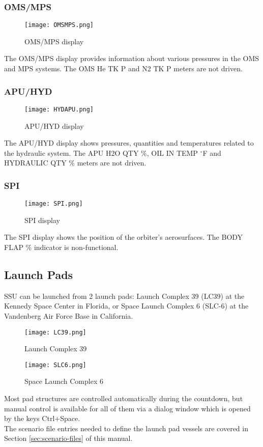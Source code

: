 \documentclass[Space_Shuttle_Ultra_Manual.tex]{subfiles}
\begin{document}
\begin{multicols*}{2}
\subsubsection{OMS/MPS}
\begin{figure}[H]
  \texttt{[image: OMSMPS.png]}
  \caption{OMS/MPS display}
  \label{fig:OMS_MPS_MEDS}
\end{figure}
The OMS/MPS display provides information about various pressures in the OMS and MPS systems. The OMS He TK P and N2 TK P meters are not driven.

\subsubsection{APU/HYD}
\begin{figure}[H]
  \texttt{[image: HYDAPU.png]}
  \caption{APU/HYD display}
  \label{fig:APU_HYD_MEDS}
\end{figure}
The APU/HYD display shows pressures, quantities and temperatures related to the hydraulic system. The APU H2O QTY \%, OIL IN TEMP $^\circ$F and HYDRAULIC QTY \% meters are not driven.

\subsubsection{SPI}
\begin{figure}[H]
  \texttt{[image: SPI.png]}
  \caption{SPI display}
  \label{fig:SPI_MEDS}
\end{figure}
The SPI display shows the position of the orbiter's aerosurfaces. The BODY FLAP \% indicator is non-functional.
\end{multicols*}

\begin{multicols*}{2}
\subsection{Launch Pads}
SSU can be launched from 2 launch pads: Launch Complex 39 (LC39) at the Kennedy Space Center in Florida, or Space Launch Complex 6 (SLC-6) at the Vandenberg Air Force Base in California.
\begin{figure}[H]
  \texttt{[image: LC39.png]}
  \caption{Launch Complex 39}
  \label{fig:LC39}
\end{figure}
\begin{figure}[H]
  \texttt{[image: SLC6.png]}
  \caption{Space Launch Complex 6}
  \label{fig:SLC6}
\end{figure}
\noindent
Most pad structures are controlled automatically during the countdown, but manual control is available for all of them via a dialog window which is opened by the keys Ctrl+Space.\\
The scenario file entries needed to define the launch pad vessels are covered in Section \ref{sec:scenario-files} of this manual.
\end{multicols*}
\end{document}
